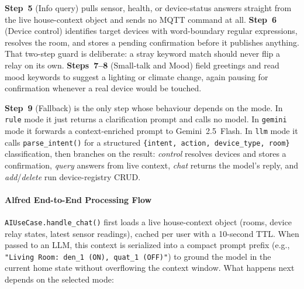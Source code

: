 \textbf{Step~5} (Info query) pulls sensor, health, or device-status answers straight from the live house-context object and sends no MQTT command at all. \textbf{Step~6} (Device control) identifies target devices with word-boundary regular expressions, resolves the room, and stores a pending confirmation before it publishes anything. That two-step guard is deliberate: a stray keyword match should never flip a relay on its own. \textbf{Steps~7--8} (Small-talk and Mood) field greetings and read mood keywords to suggest a lighting or climate change, again pausing for confirmation whenever a real device would be touched.

\textbf{Step~9} (Fallback) is the only step whose behaviour depends on the mode. In \texttt{rule} mode it just returns a clarification prompt and calls no model. In \texttt{gemini} mode it forwards a context-enriched prompt to Gemini~2.5~Flash. In \texttt{llm} mode it calls \texttt{parse\_intent()} for a structured \texttt{\{intent, action, device\_type, room\}} classification, then branches on the result: \textit{control} resolves devices and stores a confirmation, \textit{query} answers from live context, \textit{chat} returns the model's reply, and \textit{add}/\textit{delete} run device-registry CRUD.

\paragraph{Alfred End-to-End Processing Flow}
\label{subsec:alfred_e2e_flow}

\texttt{AIUseCase.handle\_chat()} first loads a live house-context object (rooms, device relay states, latest sensor readings), cached per user with a 10-second TTL. When passed to an LLM, this context is serialized into a compact prompt prefix (e.g., \texttt{"Living Room: den\_1 (ON), quat\_1 (OFF)"}) to ground the model in the current home state without overflowing the context window. What happens next depends on the selected mode:

